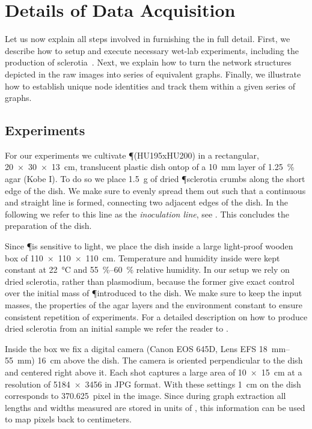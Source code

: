 
\chapter{Details of Data Acquisition}\label{app:smgr}

	Let us now explain all steps involved in furnishing the \data in full detail. First, we describe how to setup and execute necessary wet-lab experiments, including the production of sclerotia~\cite{lifecycle}. Next, we explain how to turn the network structures depicted in the raw images into series of equivalent graphs. Finally, we illustrate how to establish unique node identities and track them within a given series of graphs.

	\section{Experiments}

		For our experiments we cultivate \P (HU195xHU200) in a rectangular, \SI{20 x 30 x 13}{\centi\metre}, translucent plastic dish ontop of a \SI{10}{\milli\metre} layer of \SI[round-mode=places,round-precision=2]{1.25}{\percent} agar (Kobe I). To do so we place \SI[round-mode=places,round-precision=1]{1.5}{\gram} of dried \P sclerotia crumbs along the short edge of the dish. We make sure to evenly spread them out such that a continuous and straight line is formed, connecting two adjacent edges of the dish. In the following we refer to this line as the \emph{inoculation line}, see . This concludes the preparation of the dish. 

		Since \P is sensitive to light, we place the dish inside a large light-proof wooden box of \SI{110 x 110 x 110}{\centi\metre}. Temperature and humidity inside were kept constant at \SI{22}{\celsius} and \SIrange{55}{60}{\percent} relative humidity. In our setup we rely on dried sclerotia, rather than plasmodium, because the former give exact control over the initial mass of \P introduced to the dish. We make sure to keep the input masses, the properties of the agar layers and the environment constant to ensure consistent repetition of experiments. For a detailed description on how to produce dried sclerotia from an initial sample we refer the reader to .

		Inside the box we fix a digital camera (Canon EOS 645D, Lens EFS \SIrange{18}{55}{\milli\metre}) \SI{16}{\centi\metre} above the dish. The camera is oriented perpendicular to the dish and centered right above it. Each shot captures a large area of \SI{10 x 15}{\centi\metre} at a resolution of \SI{5184 x 3456}{\pixel} in JPG format. With these settings \SI{1}{\centi\metre} on the dish corresponds to \SI{370.625}{pixel} in the image. Since during graph extraction all lengths and widths measured are stored in units of \si{\pixel}, this information can be used to map pixels back to centimeters.

